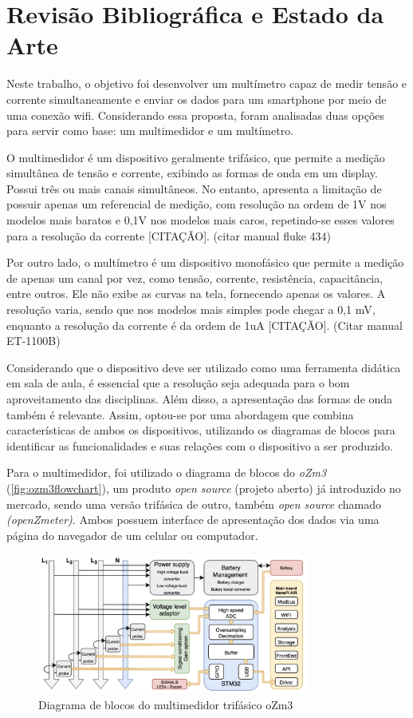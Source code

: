 \chapter{Revisão Bibliográfica e Estado da Arte}
\label{cap:refbib}

Neste trabalho, o objetivo foi desenvolver um multímetro capaz de medir tensão e corrente simultaneamente e enviar os dados para um smartphone por meio de uma conexão wifi. Considerando essa proposta, foram analisadas duas opções para servir como base: um multimedidor e um multímetro.

O multimedidor é um dispositivo geralmente trifásico, que permite a medição simultânea de tensão e corrente, exibindo as formas de onda em um display. Possui três ou mais canais simultâneos. No entanto, apresenta a limitação de possuir apenas um referencial de medição, com resolução na ordem de 1V nos modelos mais baratos e 0,1V nos modelos mais caros, repetindo-se esses valores para a resolução da corrente [CITAÇÃO]. (citar manual fluke 434)

Por outro lado, o multímetro é um dispositivo monofásico que permite a medição de apenas um canal por vez, como tensão, corrente, resistência, capacitância, entre outros. Ele não exibe as curvas na tela, fornecendo apenas os valores. A resolução varia, sendo que nos modelos mais simples pode chegar a 0,1 mV, enquanto a resolução da corrente é da ordem de 1uA [CITAÇÃO]. (Citar manual ET-1100B)

Considerando que o dispositivo deve ser utilizado como uma ferramenta didática em sala de aula, é essencial que a resolução seja adequada para o bom aproveitamento das disciplinas. Além disso, a apresentação das formas de onda também é relevante. Assim, optou-se por uma abordagem que combina características de ambos os dispositivos, utilizando os diagramas de blocos para identificar as funcionalidades e suas relações com o dispositivo a ser produzido.

Para o multimedidor, foi utilizado o diagrama de blocos do \textit{oZm3} (\autoref{fig:ozm3flowchart}), um produto \textit{open source} (projeto aberto) já introduzido no mercado, sendo uma versão trifásica de outro, também \textit{open source} chamado \textit{(openZmeter)}. Ambos possuem interface de apresentação dos dados via uma página do navegador de um celular ou computador.

\begin{figure}[h]
    \caption{Diagrama de blocos do multimedidor trifásico oZm3}
    \label{fig:ozm3flowchart}
    \includegraphics[width=0.8\textwidth]{figuras/openzmeter-diagrama.png}
\end{figure}


